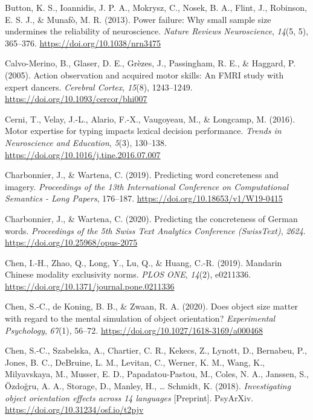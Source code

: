 \documentclass[
  12pt,
  man,floatsintext]{apa7}
\newlength{\cslhangindent}
\newlength{\cslentryspacingunit} %
\newenvironment{CSLReferences}[2] %
 {%
  \setlength{\parindent}{0pt}
  \ifodd #1
  \let\oldpar\par
  \def\par{\hangindent=\cslhangindent\oldpar}
  \fi
  \setlength{\parskip}{#2\cslentryspacingunit}
 }%
 {}
\begin{document}
\begin{CSLReferences}{1}{0}
\leavevmode{}%
Button, K. S., Ioannidis, J. P. A., Mokrysz, C., Nosek, B. A., Flint, J., Robinson, E. S. J., \& Munafò, M. R. (2013). Power failure: {Why} small sample size undermines the reliability of neuroscience. \emph{Nature Reviews Neuroscience}, \emph{14}(5, 5), 365--376. \url{https://doi.org/10.1038/nrn3475}

\leavevmode{}%
Calvo-Merino, B., Glaser, D. E., Grèzes, J., Passingham, R. E., \& Haggard, P. (2005). Action observation and acquired motor skills: {An} {FMRI} study with expert dancers. \emph{Cerebral Cortex}, \emph{15}(8), 1243--1249. \url{https://doi.org/10.1093/cercor/bhi007}

\leavevmode{}%
Cerni, T., Velay, J.-L., Alario, F.-X., Vaugoyeau, M., \& Longcamp, M. (2016). Motor expertise for typing impacts lexical decision performance. \emph{Trends in Neuroscience and Education}, \emph{5}(3), 130--138. \url{https://doi.org/10.1016/j.tine.2016.07.007}

\leavevmode{}%
Charbonnier, J., \& Wartena, C. (2019). Predicting word concreteness and imagery. \emph{Proceedings of the 13th {International Conference} on {Computational Semantics} - {Long Papers}}, 176--187. \url{https://doi.org/10.18653/v1/W19-0415}

\leavevmode{}%
Charbonnier, J., \& Wartena, C. (2020). Predicting the concreteness of {German} words. \emph{Proceedings of the 5th {Swiss Text Analytics Conference} ({SwissText})}, \emph{2624}. \url{https://doi.org/10.25968/opus-2075}

\leavevmode{}%
Chen, I.-H., Zhao, Q., Long, Y., Lu, Q., \& Huang, C.-R. (2019). Mandarin {Chinese} modality exclusivity norms. \emph{PLOS ONE}, \emph{14}(2), e0211336. \url{https://doi.org/10.1371/journal.pone.0211336}

\leavevmode{}%
Chen, S.-C., de Koning, B. B., \& Zwaan, R. A. (2020). Does object size matter with regard to the mental simulation of object orientation? \emph{Experimental Psychology}, \emph{67}(1), 56--72. \url{https://doi.org/10.1027/1618-3169/a000468}

\leavevmode{}%
Chen, S.-C., Szabelska, A., Chartier, C. R., Kekecs, Z., Lynott, D., Bernabeu, P., Jones, B. C., DeBruine, L. M., Levitan, C., Werner, K. M., Wang, K., Milyavskaya, M., Musser, E. D., Papadatou-Pastou, M., Coles, N. A., Janssen, S., Özdoğru, A. A., Storage, D., Manley, H., \ldots{} Schmidt, K. (2018). \emph{Investigating object orientation effects across 14 languages} {[}Preprint{]}. {PsyArXiv}. \url{https://doi.org/10.31234/osf.io/t2pjv}


\end{CSLReferences}
\end{document}
